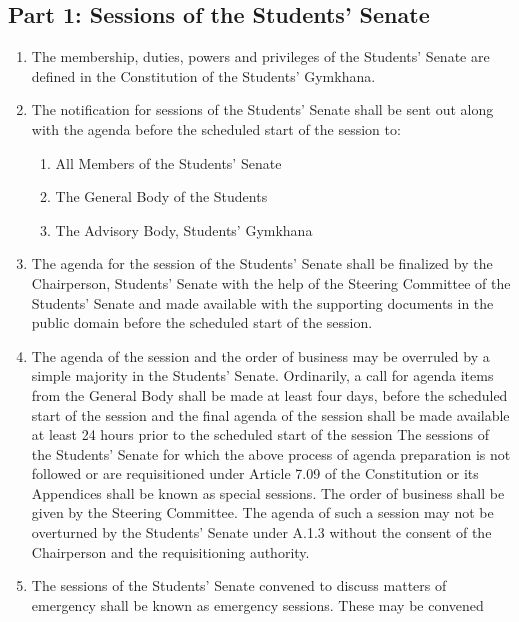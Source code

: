 \subsection{Part 1: Sessions of the Students'
Senate}\label{part-1-sessions-of-the-students-senate}

\begin{enumerate}
\def\labelenumi{\arabic{enumi}.}
\item
  The membership, duties, powers and privileges of the Students' Senate
  are defined in the Constitution of the Students' Gymkhana.
\item
  The notification for sessions of the Students' Senate shall be sent
  out along with the agenda before the scheduled start of the session
  to:

  \begin{enumerate}
  \def\labelenumii{\alph{enumii}.}
  \item
    All Members of the Students' Senate
  \item
    The General Body of the Students
  \item
    The Advisory Body, Students' Gymkhana
  \end{enumerate}
\item
  The agenda for the session of the Students' Senate shall be finalized
  by the Chairperson, Students' Senate with the help of the Steering
  Committee of the Students' Senate and made available with the
  supporting documents in the public domain before the scheduled start
  of the session.
\item
  The agenda of the session and the order of business may be overruled
  by a simple majority in the Students' Senate. Ordinarily, a call for
  agenda items from the General Body shall be made at least four days,
  before the scheduled start of the session and the final agenda of the
  session shall be made available at least 24 hours prior to the
  scheduled start of the session The sessions of the Students' Senate
  for which the above process of agenda preparation is not followed or
  are requisitioned under Article 7.09 of the Constitution or its
  Appendices shall be known as special sessions. The order of business
  shall be given by the Steering Committee. The agenda of such a session
  may not be overturned by the Students' Senate under A.1.3 without the
  consent of the Chairperson and the requisitioning authority.
\item
  The sessions of the Students' Senate convened to discuss matters of
  emergency shall be known as emergency sessions. These may be convened

\end{enumerate}
